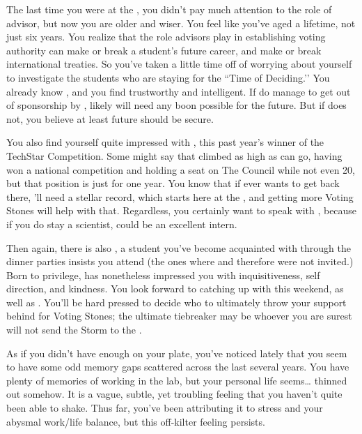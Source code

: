 \documentclass[char]{GL2020}
\begin{document}
The last time you were at the \pSchool{}, you didn't pay much attention to the role of advisor, but now you are older and wiser. You feel like you’ve aged a lifetime, not just six years. You realize that the role advisors play in establishing voting authority can make or break a student's future career, and make or break international treaties. So you've taken a little time off of worrying about yourself to investigate the \pTech{} students who are staying for the ``Time of Deciding.’’ You already know \cScholarship{}, and you find \cScholarship{\them} trustworthy and intelligent. If \cScholarship{\they} do manage to get out of sponsorship by \cAntiChup{}, \cScholarship{} likely will need any boon possible for the future. But if \cScholarship{} does not, you believe at least \cScholarship{\their} future should be secure.

You also find yourself quite impressed with \cTechStar{\full}, this past year's winner of the TechStar Competition. Some might say that \cTechStar{\theyhave} climbed as high as \cTechStar{\they} can go, having won a national competition and holding a seat on The Council while not even 20, but that position is just for one year. You know that if \cTechStar{\they} ever wants to get back there, \cTechStar{\they}'ll need a stellar record, which starts here at the \pSc{}, and getting more Voting Stones will help with that. Regardless, you certainly want to speak with \cTechStar{}, because if you do stay a scientist, \cTechStar{\they} could be an excellent intern.  

Then again, there is also \cHeir{\full}, a student you've become acquainted with through the dinner parties \cHeir{\their} \cDiplomat{\auncle} \cDiplomat{} insists you attend (the ones where \cAntiChup{} and therefore \cScholarship{} were not invited.) Born to privilege, \cHeir{} has nonetheless impressed you with \cHeir{\their} inquisitiveness, self direction, and kindness. You look forward to catching up with \cHeir{\them} this weekend, as well as \cScholarship{}. You'll be hard pressed to decide who to ultimately throw your support behind for Voting Stones; the ultimate tiebreaker may be whoever you are surest will not send the Storm to the \pTech{}.

As if you didn't have enough on your plate, you've noticed lately that you seem to have some odd memory gaps scattered across the last several years. You have plenty of memories of working in the lab, but your personal life seems\ldots{} thinned out somehow. It is a vague, subtle, yet troubling feeling that you haven't quite been able to shake. Thus far, you've been attributing it to stress and your abysmal work/life balance, but this off-kilter feeling persists.
\end{document}
